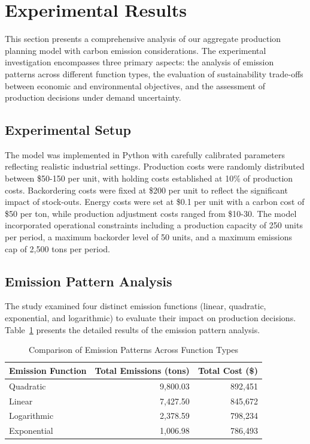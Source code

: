 \section{Experimental Results}
This section presents a comprehensive analysis of our aggregate production planning model with carbon emission considerations. The experimental investigation encompasses three primary aspects: the analysis of emission patterns across different function types, the evaluation of sustainability trade-offs between economic and environmental objectives, and the assessment of production decisions under demand uncertainty.

\subsection{Experimental Setup}
The model was implemented in Python with carefully calibrated parameters reflecting realistic industrial settings. Production costs were randomly distributed between \$50-150 per unit, with holding costs established at 10\% of production costs. Backordering costs were fixed at \$200 per unit to reflect the significant impact of stock-outs. Energy costs were set at \$0.1 per unit with a carbon cost of \$50 per ton, while production adjustment costs ranged from \$10-30. The model incorporated operational constraints including a production capacity of 250 units per period, a maximum backorder level of 50 units, and a maximum emissions cap of 2,500 tons per period.

\subsection{Emission Pattern Analysis}
The study examined four distinct emission functions (linear, quadratic, exponential, and logarithmic) to evaluate their impact on production decisions. Table~\ref{tab:emission_patterns} presents the detailed results of the emission pattern analysis.

\begin{table}[htbp]
\centering
\caption{Comparison of Emission Patterns Across Function Types}
\label{tab:emission_patterns}
\begin{tabular}{lrr}
\hline
Emission Function & Total Emissions (tons) & Total Cost (\$) \\
\hline
Quadratic & 9,800.03 & 892,451 \\
Linear & 7,427.50 & 845,672 \\
Logarithmic & 2,378.59 & 798,234 \\
Exponential & 1,006.98 & 786,493 \\
\hline
\end{tabular}
\end{table}


